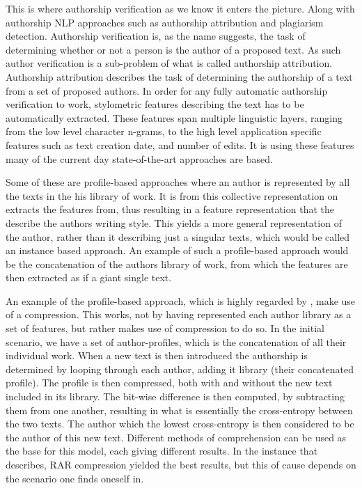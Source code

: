 This is where authorship verification as we know it enters the picture. Along
with authorship \gls{NLP} approaches such as authorship attribution and
plagiarism detection. Authorship verification is, as the name suggests, the task
of determining whether or not a person is the author of a proposed text. As such
author verification is a sub-problem of what is called authorship attribution.
Authorship attribution describes the task of determining the authorship of a
text from a set of proposed authors. In order for any fully automatic authorship
verification to work, stylometric features describing the text has to be
automatically extracted. These features span multiple linguistic layers, ranging
from the low level character n-grams, to the high level application specific
features such as text creation date, and number of edits. It is using these
features many of the current day state-of-the-art approaches are based.

Some of these are profile-based approaches where an author is represented
by all the texts in the his library of work. It is from this collective
representation on extracts the features from, thus resulting in a feature
representation that the describe the authors writing style. This yields a more
general representation of the author, rather than it describing just a singular
texts, which would be called an instance based approach. An example of such a
profile-based approach would be the concatenation of the authors library of
work, from which the features are then extracted as if a giant single text.
\cite{stamatos2009}

An example of the profile-based approach, which is highly regarded by
\cite{stamatos2009}, make use of a compression. This works, not by having
represented each author library as a set of features, but rather makes use of
compression to do so. In the initial scenario, we have a set of author-profiles,
which is the concatenation of all their individual work. When a new text is then
introduced the authorship is determined by looping through each author, adding
it library (their concatenated profile). The profile is then compressed, both
with and without the new text included in its library. The bit-wise difference
is then computed, by subtracting them from one another, resulting in what is
essentially the cross-entropy between the two texts. The author which the lowest
cross-entropy is then considered to be the author of this new text. Different
methods of comprehension can be used as the base for this model, each giving
different results. In the instance that \cite{stamatos2009} describes, RAR
compression yielded the best results, but this of cause depends on the scenario
one finds oneself in.

